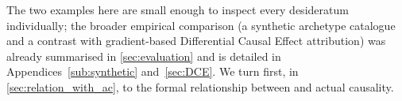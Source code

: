 The two examples here are small enough to inspect
every desideratum individually; the broader empirical comparison (a synthetic
archetype catalogue and a contrast with gradient-based Differential Causal Effect
attribution) was already summarised in \cref{sec:evaluation} and is detailed in
Appendices~\ref{sub:synthetic} and~\ref{sec:DCE}. We turn first, in
\cref{sec:relation_with_ac}, to the formal relationship between \ourapproach and
actual causality.


